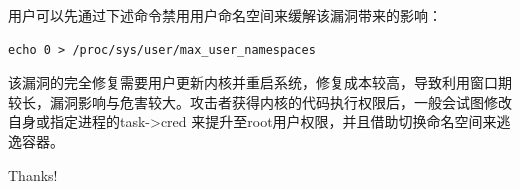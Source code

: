 \documentclass[xcolor=table]{beamer}
\begin{document}
\begin{frame}[fragile]
\small{用户可以先通过下述命令禁用用户命名空间来缓解该漏洞带来的影响：}
\tiny\begin{lstlisting}
echo 0 > /proc/sys/user/max_user_namespaces
\end{lstlisting}

\small{该漏洞的完全修复需要用户更新内核并重启系统，修复成本较高，导致利用窗口期较长，漏洞影响与危害较大。攻击者获得内核的代码执行权限后，一般会试图修改自身或指定进程的task->cred 来提升至root用户权限，并且借助切换命名空间来逃逸容器。}

\end{frame}










\begin{frame}
\begin{center}
{\Huge Thanks!}
\end{center}
\end{frame}
\end{document}
